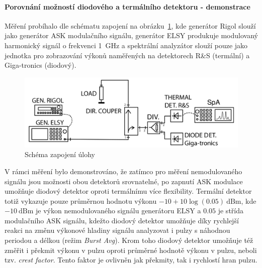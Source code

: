 \documentclass[11pt,a4paper]{article}
\newcommand{\dBm}{\mathrm{dBm}}
\begin{document}
\paragraph*{Porovnání možností diodového a termálního detektoru - demonstrace} Měření probíhalo dle schématu zapojení na obrázku~\ref{fig:task1-zapojeni}, kde generátor Rigol slouží jako generátor ASK modulačního signálu, generátor ELSY produkuje modulovaný harmonický signál o frekvenci 1~GHz a spektrální analyzátor slouží pouze jako jednotka pro zobrazování výkonů naměřených na detektorech R\&S (termální) a Giga-tronics (diodový).
\begin{figure}[!ht]
    \centering
    \includegraphics[width=.8\textwidth]{src/task1-zapojeni.png}
    \caption{\label{fig:task1-zapojeni}Schéma zapojení úlohy}
\end{figure}
V rámci měření bylo demonstrováno, že zatímco pro měření nemodulovaného signálu jsou možnosti obou detektorů srovnatelné, po zapnutí ASK modulace umožňuje diodový detektor oproti termálnímu více flexibility. Termální detektor totiž vykazuje pouze průměrnou hodnotu výkonu $-10+10\log(0.05)\ \dBm$, kde $-10\ \dBm$ je výkon nemodulovaného signálu generátoru ELSY a $0.05$ je střída modulačního ASK signálu, kdežto diodový detektor umožňuje díky rychlejší reakci na změnu výkonové hladiny signálu analyzovat i pulzy s náhodnou periodou a délkou (režim \emph{Burst Avg}). Krom toho diodový detektor umožňuje též změřit i překmit výkonu v pulzu oproti průměrné hodnotě výkonu v pulzu, neboli tzv. \emph{crest factor}. Tento faktor je ovlivněn jak překmity, tak i rychlostí hran pulzu.

\end{document}
